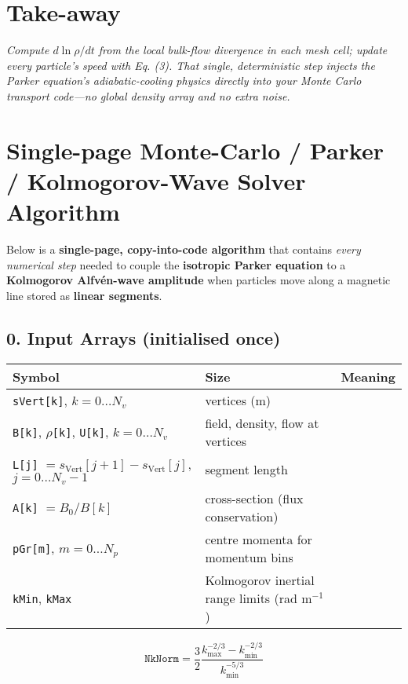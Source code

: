 \hrulefill

\section*{Take-away}

\textit{Compute $d\ln\rho/dt$ from the local bulk-flow divergence in each mesh cell; update every particle’s speed with Eq. (3). That single, deterministic step injects the Parker equation’s adiabatic-cooling physics directly into your Monte Carlo transport code—no global density array and no extra noise.}

\section*{Single-page Monte-Carlo / Parker / Kolmogorov-Wave Solver Algorithm}

Below is a \textbf{single-page, copy-into-code algorithm} that contains \emph{every numerical step} needed to couple the \textbf{isotropic Parker equation} to a \textbf{Kolmogorov Alfvén-wave amplitude} when particles move along a magnetic line stored as \textbf{linear segments}.

\subsection*{0. Input Arrays (initialised once)}

\begin{tabular}{|l|l|l|}
\hline
\textbf{Symbol} & \textbf{Size} & \textbf{Meaning} \\
\hline
\texttt{sVert[k]}, $k=0\ldots N_v$ & vertices (m) & \\
\texttt{B[k]}, \texttt{$\rho$[k]}, \texttt{U[k]}, $k=0\ldots N_v$ & field, density, flow at vertices & \\
\texttt{L[j]} $= s_{\text{Vert}}[j+1] - s_{\text{Vert}}[j]$, $j=0\ldots N_v-1$ & segment length & \\
\texttt{A[k]} $= B_0/B[k]$ & cross-section (flux conservation) & \\
\texttt{pGr[m]}, $m=0\ldots N_p$ & centre momenta for momentum bins & \\
\texttt{kMin}, \texttt{kMax} & Kolmogorov inertial range limits (rad m$^{-1}$) & \\
\hline
\end{tabular}

\[
\texttt{NkNorm} = \frac{3}{2} \frac{k_{\max}^{-2/3} - k_{\min}^{-2/3}}{k_{\min}^{-5/3}} \tag{Eq.(2)}
\]

